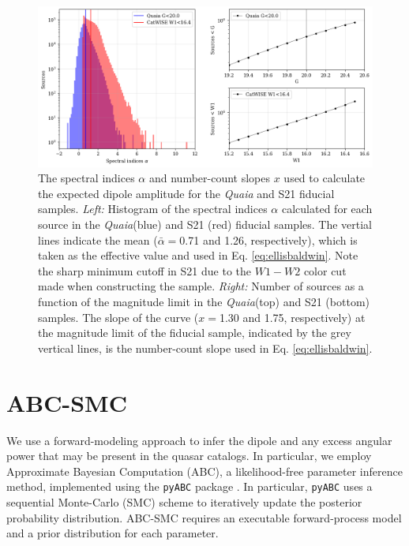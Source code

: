 \documentclass[modern]{aastex631}
\newcommand{\quaia}{\textsl{Quaia}\xspace}
\begin{document}
\begin{figure}
    \centering
    \includegraphics[width=\textwidth]{images/alphas_xs_G20.5.png}
    \caption{The spectral indices $\alpha$ and number-count slopes $x$ used to calculate the expected dipole amplitude for the \quaia and S21 fiducial samples. \textit{Left:} Histogram of the spectral indices $\alpha$ calculated for each source in the \quaia (blue) and S21 (red) fiducial samples. The vertial lines indicate the mean ($\bar\alpha=$0.71 and 1.26, respectively), which is taken as the effective value and used in Eq. \ref{eq:ellisbaldwin}. Note the sharp minimum cutoff in S21 due to the $W1-W2$ color cut made when constructing the sample. \textit{Right:} Number of sources as a function of the magnitude limit in the \quaia (top) and S21 (bottom) samples. The slope of the curve ($x=$1.30 and 1.75, respectively) at the magnitude limit of the fiducial sample, indicated by the grey vertical lines, is the number-count slope used in Eq. \ref{eq:ellisbaldwin}.}
    \label{fig:alphas_xs}
\end{figure}


\section{ABC-SMC}
\label{sec:AMCSMC}

We use a forward-modeling approach to infer the dipole and any excess angular power that may be present in the quasar catalogs.
In particular, we employ Approximate Bayesian Computation (ABC), a likelihood-free parameter inference method, implemented using the \texttt{pyABC} package \citep{schalte_pyabc_2022}.
In particular, \texttt{pyABC} uses a sequential Monte-Carlo (SMC) scheme to iteratively update the posterior probability distribution.
ABC-SMC requires an executable forward-process model and a prior distribution for each parameter.
\end{document}
